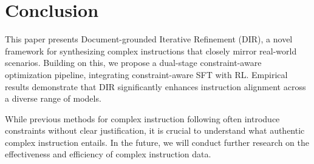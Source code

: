 \section{Conclusion}
This paper presents Document-grounded Iterative Refinement (DIR), a novel framework for synthesizing complex instructions that closely mirror real-world scenarios. Building on this, we propose a dual-stage constraint-aware optimization pipeline, integrating constraint-aware SFT with RL. Empirical results demonstrate that DIR significantly enhances instruction alignment across a diverse range of models.

While previous methods for complex instruction following often introduce constraints without clear justification, it is crucial to understand what authentic complex instruction entails. In the future, we will conduct further research on the effectiveness and efficiency of complex instruction data.